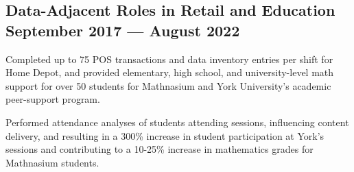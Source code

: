\subsection{{Data-Adjacent Roles in Retail and Education \hfill September 2017 --- August 2022}}
\begin{zitemize}
\item Completed up to 75 POS transactions and data inventory entries per shift for Home Depot, and provided elementary, high school, and university-level math support for over 50 students for Mathnasium and York University's academic peer-support program.
\item Performed attendance analyses of students attending sessions, influencing content delivery, and resulting in a 300\% increase in student participation at York's sessions and contributing to a 10-25\% increase in mathematics grades for Mathnasium students.
\end{zitemize}


